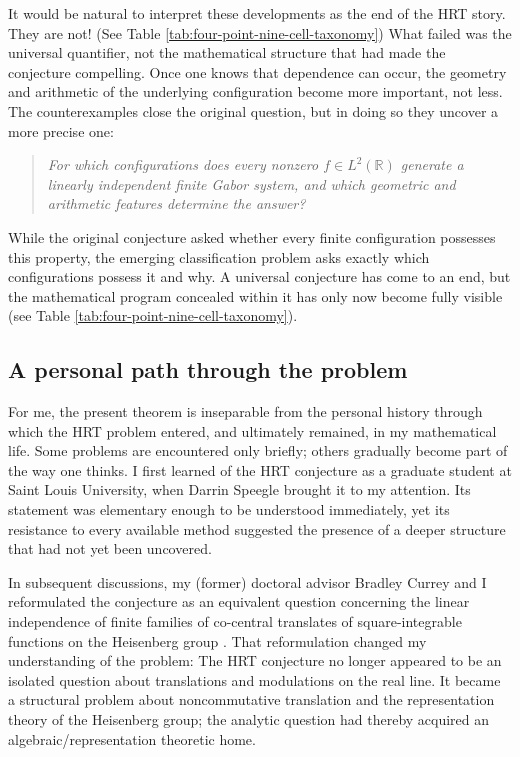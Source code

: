 \documentclass[reqno]{amsart}
\theoremstyle{remark}
\numberwithin{equation}{section}
\newcommand{\R}{\mathbb{R}}
\begin{document}
It would be natural to interpret these developments as the end of the HRT
story. They are not! (See Table \ref{tab:four-point-nine-cell-taxonomy}) What failed was the universal quantifier, not the
mathematical structure that had made the conjecture compelling. Once one
knows that dependence can occur, the geometry and arithmetic of the
underlying configuration become more important, not less. The
counterexamples close the original question, but in doing so they uncover a
more precise one:

\begin{quote}
\textit{For which configurations does every nonzero \(f\in L^2(\R)\) generate a
linearly independent finite Gabor system, and which geometric and arithmetic
features determine the answer?}
\end{quote}

While the original conjecture asked whether every finite configuration possesses
this property, the emerging classification problem asks exactly which
configurations possess it and why. A universal conjecture has come to an
end, but the mathematical program concealed within it has only now become
fully visible (see Table \ref{tab:four-point-nine-cell-taxonomy}).

\subsection{A personal path through the problem}

For me, the present theorem is inseparable from the personal history through
which the HRT problem entered, and ultimately remained, in my mathematical
life. Some problems are encountered only briefly; others gradually become
part of the way one thinks. I first learned of the HRT conjecture as a
graduate student at Saint Louis University, when Darrin Speegle brought it to
my attention. Its statement was elementary enough to be understood
immediately, yet its resistance to every available method suggested the
presence of a deeper structure that had not yet been uncovered.

In subsequent discussions, my (former) doctoral advisor Bradley Currey and I reformulated the
conjecture as an equivalent question concerning the linear independence of
finite families of co-central translates of square-integrable functions on
the Heisenberg group \cite{CurreyOussa}. That reformulation changed my
understanding of the problem: The HRT conjecture no longer appeared to be an
isolated question about translations and modulations on the real line. It
became a structural problem about noncommutative translation and the
representation theory of the Heisenberg group; the analytic question had
thereby acquired an algebraic/representation theoretic home.
\end{document}
